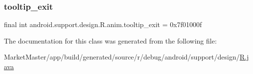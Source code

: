 \mbox{\label{classandroid_1_1support_1_1design_1_1R_1_1anim_a8910053bfee4a8e697723bf6d813af70}} 
\subsubsection{\texorpdfstring{tooltip\+\_\+exit}{tooltip\_exit}}
{\footnotesize\ttfamily final int android.\+support.\+design.\+R.\+anim.\+tooltip\+\_\+exit = 0x7f01000f\hspace{0.3cm}{\ttfamily [static]}}



The documentation for this class was generated from the following file\+:\begin{DoxyCompactItemize}
\item 
Market\+Master/app/build/generated/source/r/debug/android/support/design/\mbox{\hyperlink{debug_2android_2support_2design_2R_8java}{R.\+java}}\end{DoxyCompactItemize}
